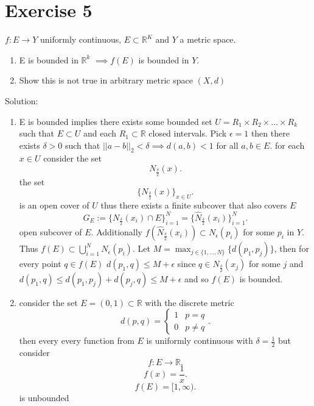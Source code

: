 \documentclass[11pt]{article}
\newcommand{\solution}[1]{{{\textcolor{header}{Solution:} \textcolor{solution}{#1}}}}
\begin{document}
\section{Exercise 5}
$f : E \rightarrow Y$ uniformly continuous, $E \subset \mathbb{R}^{K}$ and $Y$ a metric space.
\begin{enumerate}
    \item E is bounded in $ \mathbb{R}^{k}$ $\implies f(E)$ is bounded in $Y$.
    \item Show this is not true in arbitrary metric space $(X,d)$
\end{enumerate}
\solution{
    \begin{enumerate}
        \item E is bounded implies there exists some bounded set $U = R_1 \times R_2 \times \dots \times R_k$ such that $E \subset U$ and each $R_1 \subset \mathbb{R}$ closed intervals.
            Pick $\epsilon = 1$ then there exists $\delta > 0$ such that $||a-b||_2 < \delta \implies d(a,b) < 1$ for all $a,b \in E$. for each  $x \in U$ consider the set
             \[
            N_\frac{\delta}{2}(x)
            .\] 
            the set 
            \[
                \{N_\frac{\delta}{2}(x)\}_{x \in U}
            .\] 
            is an open cover of $U$ thus there exists a finite subcover that also covers $E$ 
            \[
                G_E := \{N_\frac{\delta}{2}(x_i) \cap E\}_{i=1}^{N} = \{\hat N_\frac{\delta}{2}(x_i)\}_{i=1}^{N}
            .\] 
            open subcover of $E$. Additionally $f(\hat N_\frac{\delta}{2}(x_i)) \subset N_\epsilon(p_i)$ for some $p_i$ in $Y$.
            Thus $f(E) \subset \bigcup_{i=1}^{N}N_\epsilon(p_i)$. Let $M = \max_{j\in\{1,...,N\}}\{d(p_1,p_j)\}$, then for every point  $q \in f(E)$
             $d(p_1,q) \le M + \epsilon$ since $q \in \hat N_\frac{\delta}{2}(x_j)$ for some $j$ and $d(p_1,q) \le d(p_1,p_j) + d(p_j,q) \le M + \epsilon$ and so $f(E)$ is bounded.
         \item  consider the set $E = (0,1) \subset \mathbb{R}$ with the discrete metric
             \[
             d(p,q) = 
             \begin{cases}
                 1 & p = q\\
                 0 & p \ne q
             \end{cases}
             .\] 
             then every every function from $E$ is uniformly continuous with $\delta = \frac{1}{2}$ but consider
             \[
             f  : E \rightarrow \mathbb{R}
             .\] 
             \[
             f(x) = \frac{1}{x}
             .\] 
             \[
             f(E) = [1,\infty)
             .\] 
             is unbounded
    \end{enumerate}
}
\end{document}
